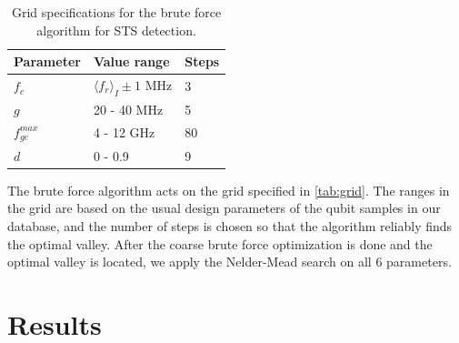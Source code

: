 \documentclass[%
 aip,
 draft,
 amsmath,amssymb,
 reprint,%
]{revtex4-1}
\begin{document}
\begin{table}
	\centering
	\begin{ruledtabular}
		\begin{tabular}{lll} 
			Parameter & Value range & Steps \\ 
			\hline
			$f_c$ & $\langle f_r \rangle_{I} \pm 1$ MHz & 3\\ 
			$g$ & 20 - 40 MHz & 5\\
			$f_{ge}^{max}$ &  4 - 12 GHz & 80 \\
			$d$& 0 - 0.9 & 9
		\end{tabular} 
	\end{ruledtabular}
	\caption{Grid specifications for the brute force algorithm for STS detection.}
	\label{tab:grid}
\end{table}

The brute force algorithm acts on the grid specified in \autoref{tab:grid}. The ranges in the grid are based on the usual design parameters of the qubit samples in our database, and the number of steps is chosen so that the algorithm reliably finds the optimal valley. After the coarse brute force optimization is done and the optimal valley is located, we apply the Nelder-Mead search on all 6 parameters.


\section{Results}
\end{document}
